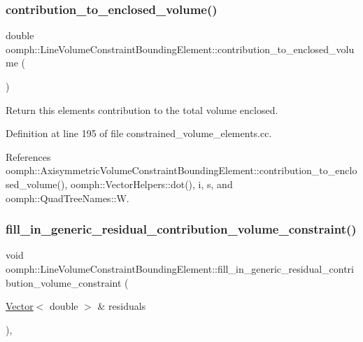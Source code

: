 \subsubsection{\texorpdfstring{contribution\+\_\+to\+\_\+enclosed\+\_\+volume()}{contribution\_to\_enclosed\_volume()}}
{\footnotesize\ttfamily double oomph\+::\+Line\+Volume\+Constraint\+Bounding\+Element\+::contribution\+\_\+to\+\_\+enclosed\+\_\+volume (\begin{DoxyParamCaption}{ }\end{DoxyParamCaption})}



Return this element\textquotesingle{}s contribution to the total volume enclosed. 



Definition at line 195 of file constrained\+\_\+volume\+\_\+elements.\+cc.



References oomph\+::\+Axisymmetric\+Volume\+Constraint\+Bounding\+Element\+::contribution\+\_\+to\+\_\+enclosed\+\_\+volume(), oomph\+::\+Vector\+Helpers\+::dot(), i, s, and oomph\+::\+Quad\+Tree\+Names\+::W.

\mbox{\label{classoomph_1_1LineVolumeConstraintBoundingElement_a03145a064e559d786f730c85000f9fb4}} 
\subsubsection{\texorpdfstring{fill\+\_\+in\+\_\+generic\+\_\+residual\+\_\+contribution\+\_\+volume\+\_\+constraint()}{fill\_in\_generic\_residual\_contribution\_volume\_constraint()}}
{\footnotesize\ttfamily void oomph\+::\+Line\+Volume\+Constraint\+Bounding\+Element\+::fill\+\_\+in\+\_\+generic\+\_\+residual\+\_\+contribution\+\_\+volume\+\_\+constraint (\begin{DoxyParamCaption}\item[{\hyperlink{classoomph_1_1Vector}{Vector}$<$ double $>$ \&}]{residuals }\end{DoxyParamCaption})\hspace{0.3cm}{\ttfamily [protected]}, {\ttfamily [virtual]}}



